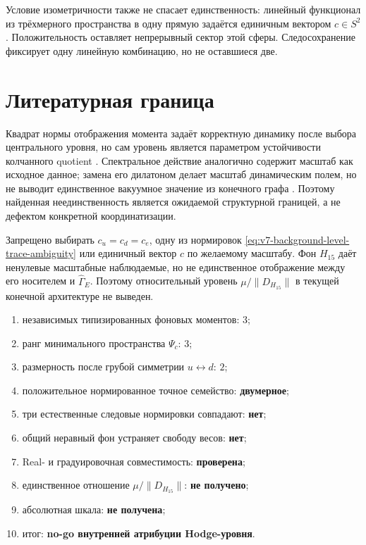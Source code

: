 Условие изометричности также не спасает единственность: линейный функционал
из трёхмерного пространства в одну прямую задаётся единичным вектором
$c\in S^2$. Положительность оставляет непрерывный сектор этой сферы.
Следосохранение фиксирует одну линейную комбинацию, но не оставшиеся две.

\section{Литературная граница}

Квадрат нормы отображения момента задаёт корректную динамику после выбора
центрального уровня, но сам уровень является параметром устойчивости
колчанного quotient \cite{v7-background-level-harada}. Спектральное действие
аналогично содержит масштаб как исходное данное; замена его дилатоном делает
масштаб динамическим полем, но не выводит единственное вакуумное значение из
конечного графа \cite{v7-background-level-dilaton}. Поэтому найденная
неединственность является ожидаемой структурной границей, а не дефектом
конкретной координатизации.

\begin{nogocriterion}
Запрещено выбирать $c_u=c_d=c_e$, одну из нормировок
\eqref{eq:v7-background-level-trace-ambiguity} или единичный вектор $c$ по
желаемому масштабу. Фон $H_{15}$ даёт ненулевые масштабные наблюдаемые, но
не единственное отображение между его носителем и
$\widehat\Gamma_E$. Поэтому относительный уровень $\mu/\|D_{H_{15}}\|$ в
текущей конечной архитектуре не выведен.
\end{nogocriterion}

\begin{protocol}
\begin{enumerate}
 \item независимых типизированных фоновых моментов: \textbf{$3$};
 \item ранг минимального пространства $\Psi_c$: \textbf{$3$};
 \item размерность после грубой симметрии $u\leftrightarrow d$:
 \textbf{$2$};
 \item положительное нормированное точное семейство: \textbf{двумерное};
 \item три естественные следовые нормировки совпадают: \textbf{нет};
 \item общий неравный фон устраняет свободу весов: \textbf{нет};
 \item Real- и градуировочная совместимость: \textbf{проверена};
 \item единственное отношение $\mu/\|D_{H_{15}}\|$: \textbf{не получено};
 \item абсолютная шкала: \textbf{не получена};
 \item итог: \textbf{no-go внутренней атрибуции Hodge-уровня}.
\end{enumerate}
\end{protocol}

